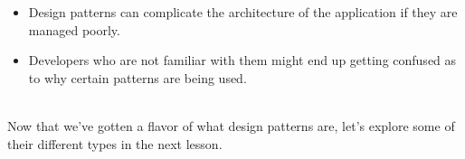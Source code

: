 \begin{itemize}
\item
Design patterns can complicate the architecture of the application if they are managed poorly.
\item
Developers who are not familiar with them might end up getting confused as to why certain patterns are being used.
\end{itemize}
\\
Now that we've gotten a flavor of what design patterns are, let's explore some of their different types in the next lesson.

